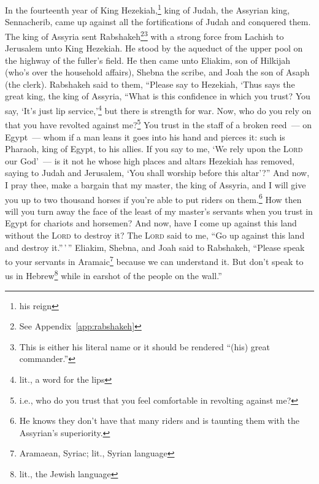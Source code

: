 
\begin{inparaenum}
     In the fourteenth year of King Hezekiah,\footnote{his reign} king of Judah, the Assyrian king, Sennacherib, came up against all the fortifications of Judah and conquered them.%
     The king of Assyria sent Rabshakeh\footnote{See Appendix~\ref{app:rabshakeh}}\footnote{This is either his literal name or it should be rendered ``(his) great commander.''} with a strong force from Lachish to Jerusalem unto King Hezekiah. He stood by the aqueduct of the upper pool on the highway of the fuller's field.%
     He then came unto Eliakim, son of Hilkijah (who's over the household affairs), Shebna the scribe, and Joah the son of Asaph (the clerk).%
     Rabshakeh said to them, ``Please say to Hezekiah, `Thus says the great king, the king of Assyria, ``What is this confidence in which you trust?%
     You say, `It's just lip service,'\footnote{lit., a word for the lips} but there is strength for war. Now, who do you rely on that you have revolted against me?\footnote{i.e., who do you trust that you feel comfortable in revolting against me?}%
     You trust in the staff of a broken reed~--- on Egypt~--- whom if a man leans it goes into his hand and pierces it: such is Pharaoh, king of Egypt, to his allies.%
     If you say to me, `We rely upon the \textsc{Lord} our God'~--- is it not he whose high places and altars Hezekiah has removed, saying to Judah and Jerusalem, `You shall worship before this altar'?''%
     And now, I pray thee, make a bargain that my master, the king of Assyria, and I will give you up to two thousand horses if you're able to put riders on them.\footnote{He knows they don't have that many riders and is taunting them with the Assyrian's superiority.}%
     How then will you turn away the face of the least of my master's servants when you trust in Egypt for chariots and horsemen?%
     And now, have I come up against this land without the \textsc{Lord} to destroy it? The \textsc{Lord} said to me, ``Go up against this land and destroy it.''\,'\,''%
     Eliakim, Shebna, and Joah said to Rabshakeh, ``Please speak to your servants in Aramaic\footnote{Aramaean, Syriac; lit., Syrian language} because we can understand it. But don't speak to us in Hebrew\footnote{lit., the Jewish language} while in earshot of the people on the wall.''%

\end{inparaenum}
